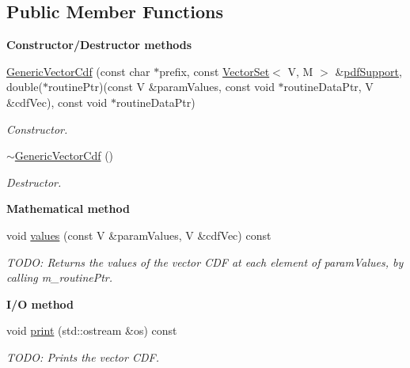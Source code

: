 \subsection*{Public Member Functions}
\begin{Indent}{\bf Constructor/\-Destructor methods}\par
\begin{DoxyCompactItemize}
\item 
\hyperlink{class_q_u_e_s_o_1_1_generic_vector_cdf_a76cb484b4bb7fb3450bd64777108b1a7}{Generic\-Vector\-Cdf} (const char $\ast$prefix, const \hyperlink{class_q_u_e_s_o_1_1_vector_set}{Vector\-Set}$<$ V, M $>$ \&\hyperlink{class_q_u_e_s_o_1_1_base_vector_cdf_aaf5088d3994606a9d449ccd414509709}{pdf\-Support}, double($\ast$routine\-Ptr)(const V \&param\-Values, const void $\ast$routine\-Data\-Ptr, V \&cdf\-Vec), const void $\ast$routine\-Data\-Ptr)
\begin{DoxyCompactList}\small\item\em Constructor. \end{DoxyCompactList}\item 
\hyperlink{class_q_u_e_s_o_1_1_generic_vector_cdf_a4a8e94de6837482e7ac90cd993c4431a}{$\sim$\-Generic\-Vector\-Cdf} ()
\begin{DoxyCompactList}\small\item\em Destructor. \end{DoxyCompactList}\end{DoxyCompactItemize}
\end{Indent}
\begin{Indent}{\bf Mathematical method}\par
\begin{DoxyCompactItemize}
\item 
void \hyperlink{class_q_u_e_s_o_1_1_generic_vector_cdf_aac56bdb8cbe36b161cf238db695eb454}{values} (const V \&param\-Values, V \&cdf\-Vec) const 
\begin{DoxyCompactList}\small\item\em T\-O\-D\-O\-: Returns the values of the vector C\-D\-F at each element of {\ttfamily param\-Values}, by calling {\ttfamily m\-\_\-routine\-Ptr}. \end{DoxyCompactList}\end{DoxyCompactItemize}
\end{Indent}
\begin{Indent}{\bf I/\-O method}\par
\begin{DoxyCompactItemize}
\item 
void \hyperlink{class_q_u_e_s_o_1_1_generic_vector_cdf_a475687f4b66245980a79fcc825c76c7c}{print} (std\-::ostream \&os) const 
\begin{DoxyCompactList}\small\item\em T\-O\-D\-O\-: Prints the vector C\-D\-F. \end{DoxyCompactList}\end{DoxyCompactItemize}
\end{Indent}
